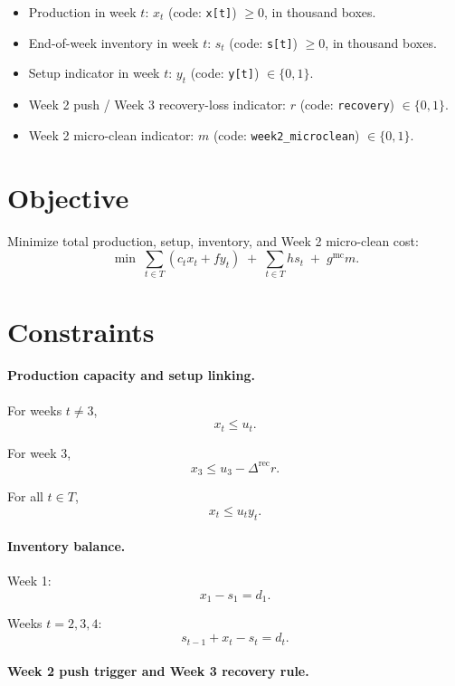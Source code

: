 \begin{itemize}
    \item Production in week $t$: $x_t$ (code: \texttt{x[t]}) \(\ge 0\), in thousand boxes.
    \item End-of-week inventory in week $t$: $s_t$ (code: \texttt{s[t]}) \(\ge 0\), in thousand boxes.
    \item Setup indicator in week $t$: $y_t$ (code: \texttt{y[t]}) \(\in\{0,1\}\).
    \item Week 2 push / Week 3 recovery-loss indicator: $r$ (code: \texttt{recovery}) \(\in\{0,1\}\).
    \item Week 2 micro-clean indicator: $m$ (code: \texttt{week2\_microclean}) \(\in\{0,1\}\).
\end{itemize}

\section*{Objective}

Minimize total production, setup, inventory, and Week 2 micro-clean cost:
\[
\min \;
\sum_{t\in T} \left(c_t x_t + f y_t\right)
\;+\;
\sum_{t\in T} h s_t
\;+\;
g^{\mathrm{mc}} m .
\]

\section*{Constraints}

\paragraph{Production capacity and setup linking.}

For weeks $t\neq 3$,
\[
x_t \le u_t .
\]

For week $3$,
\[
x_3 \le u_3 - \Delta^{\mathrm{rec}} r .
\]

For all $t\in T$,
\[
x_t \le u_t y_t .
\]

\paragraph{Inventory balance.}

Week 1:
\[
x_1 - s_1 = d_1 .
\]

Weeks $t=2,3,4$:
\[
s_{t-1} + x_t - s_t = d_t .
\]

\paragraph{Week 2 push trigger and Week 3 recovery rule.}

